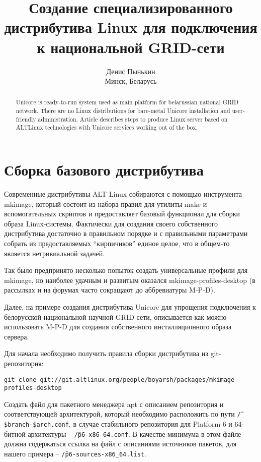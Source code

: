 \documentclass[10pt, a5paper]{article}
\begin{document}
\title{Создание специализированного дистрибутива Linux для подключения к национальной GRID-сети}
\author{Денис Пынькин\\
\small Минск, Беларусь}
\def\progref!#1!{\texttt{#1}}

\maketitle

\begin{abstract}
Unicore is ready-to-run system used as main platform for belarussian national GRID network. 
There are no Linux distributions for bare-metal Unicore installation and user-friendly administration. 
Article describes steps to produce Linux server based on ALTLinux technologies with Unicore services working out of the box.
\end{abstract}

\section*{Сборка базового дистрибутива}
Современные дистрибутивы ALT Linux собираются с помощью инструмента mkimage,
который состоит из набора правил для утилиты make и вспомогательных скриптов 
и предоставляет базовый функционал для сборки образа Linux-системы. 
Фактически для создания своего собственного дистрибутива достаточно в 
правильном порядке и с правильными параметрами собрать из предоставляемых 
``кирпичиков'' единое целое, что в общем-то является нетривиальной задачей.

Так было предпринято несколько попыток создать универсальные профили для mkimage,
но наиболее удачным и развитым оказался mkimage-profiles-desktop 
(в рассылках и на форумах часто сокращают до аббревиатуры M-P-D).

Далее, на примере создания дистрибутива Unicore для упрощения подключения к 
белорусской национальной научной GRID-сети, описывается как можно 
использовать M-P-D для создания собственного инсталляционного образа сервера.

Для начала необходимо получить правила сборки дистрибутива из git-репозитория:
\begin{verbatim}
git clone git://git.altlinux.org/people/boyarsh/packages/mkimage-profiles-desktop
\end{verbatim}

 Создать файл для пакетного менеджера apt с описанием репозитория и соответствующей 
 архитектурой, который необходимо расположить по пути {\tt \~/\$branch-\$arch.conf}, 
 в случае стабильного репозитория для Platform 6 и 64-битной архитектуры -- 
 {\tt \~/p6-x86\_64.conf}. В качестве минимума в этом файле должна содержаться 
 ссылка на файл с описаниями источников пакетов, для нашего примера -- 
 {\tt \~/p6-sources-x86\_64.list}.
\end{document}
